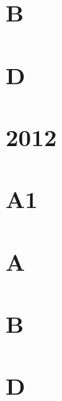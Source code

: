 \documentclass{article}
\begin{document}
\section*{B}
\section*{D}



\section*{2012}
\section*{A1}
\section*{A}
\section*{B}
\section*{D}
\end{document}
